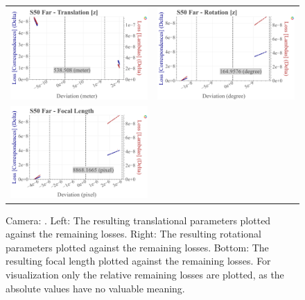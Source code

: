 \begin{figure}[!ht]
\begin{tabular}{cc}
    \includegraphics[width=0.45 \linewidth]{diagrams/calibration/s50_s_far/parameters.csv/Translation[z]_vs_Loss[Correspondences]_vs_Loss[Lambdas]_cluster_All.png} &
    \includegraphics[width=0.45 \linewidth]{diagrams/calibration/s50_s_far/parameters.csv/Rotation[z]_vs_Loss[Correspondences]_vs_Loss[Lambdas]_cluster_All.png} \\

    \includegraphics[width=0.45 \linewidth]{diagrams/calibration/s50_s_far/parameters.csv/FocalLength_vs_Loss[Correspondences]_vs_Loss[Lambdas]_cluster_All.png} &

  \end{tabular}
\caption{
  Camera: .
  Left: The resulting translational parameters plotted against the remaining losses. 
  Right: The resulting rotational parameters plotted against the remaining losses.
  Bottom: The resulting focal length  plotted against the remaining losses.
  For visualization only the relative remaining losses are plotted, as the absolute values have no valuable meaning.
    }
\label{fig:static_calibration_algorithmic_error_s50_s_far}
\end{figure}

